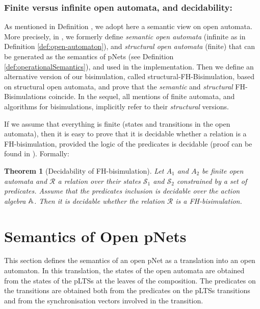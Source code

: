 \documentclass{lmcs}
\newtheorem{theorem}{Theorem}
\begin{document}
\subsubsection*{Finite versus infinite open automata, and decidability:} 
As mentioned in Definition \pageref{def:open-automaton}, we adopt here a semantic view on open automata. More precisely, in \cite{hou:hal-02406098}, we formerly define
\emph{semantic open automata} (infinite as in Definition \ref{def:open-automaton}),
and \emph{structural open automata} (finite) that can be generated as
the semantics of pNets (see Definition \ref{def:operationalSemantics}), and used in the implementation. Then we define
an alternative version of our bisimulation, called
structural-FH-Bisimulation, based on structural open automata, and
prove that the \emph{semantic} and \emph{structural} FH-Bisimulations coincide.
In the sequel, all mentions of finite automata, and algorithms for
bisimulations, implicitly refer to their \emph{structural} versions.

If we assume that everything is finite (states and transitions in the
open automata), then it is easy to
prove that it is decidable whether a relation is a 
FH-bisimulation, provided the logic of the predicates is
decidable (proof can be found in \cite{henrio:Forte2016}). Formally:

\begin{theorem}[Decidability of FH-bisimulation]
Let $A_1$ and $A_2$ be finite open automata
and $\mathcal{R}$ a relation over their states $\mathcal{S}_1$ and
$\mathcal{S}_2$ constrained by a set of predicates. Assume that
the predicates inclusion is decidable over  
the action algebra $\mathbb{A}$. Then it is decidable whether the relation 
$\mathcal{R}$ is a FH-bisimulation.
  
\end{theorem}



\section{Semantics of Open pNets}
\label{section:op-semantics}

This section defines the semantics of an open pNet as a translation into an open automaton. 
In this translation, the states of the open automata are obtained from
the states of the pLTSs at the leaves of the composition. The
predicates on the transitions are obtained both from the predicates on
the pLTSs transitions and from the synchronisation vectors involved in
the transition. 
\end{document}
